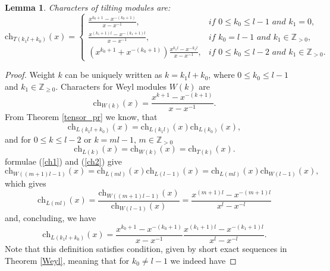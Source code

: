 \documentclass[11pt]{amsart}
\newtheorem{lemma}[theorem]{Lemma}
\begin{document}
\begin{lemma} \label{fchar}Characters of tilting modules are:
\begin{equation*}
\mathrm{ch}_{T(k_1l+k_0)}(x)=
\begin{cases}
\frac{x^{k_0+1}-x^{-(k_0+1)}}{x-x^{-1}},& \textit{if $0\leq k_0\leq l-1$ and $k_1=0$},\\
\frac{x^{(k_1+1)l}-x^{-(k_1+1)l}}{x-x^{-1}},& \textit{if $k_0=l-1$ and $k_1\in\mathbb{Z}_{>0}$},\\
(x^{k_0+1}+x^{-(k_0+1)})\frac{x^{k_1l}-x^{-k_1l}}{x-x^{-1}},& \textit{if $0\leq k_0\leq l-2$ and $k_1\in\mathbb{Z}_{>0}$}.
\end{cases}
\end{equation*}
	\end{lemma}
\begin{proof}
	Weight $k$ can be uniquely written as $k=k_1l+k_0$, where $0\leq k_0\leq l-1$ and $k_1\in\mathbb{Z}_{\geq 0}$. Characters for Weyl modules $W(k)$ are 	
	\begin{equation*}
	\mathrm{ch}_{W(k)}(x)=\frac{x^{k+1}-x^{-(k+1)}}{x-x^{-1}}.
	\end{equation*}
	From Theorem \ref{tensor_pr} we know, that 
	\begin{equation}\label{ch1}
	\mathrm{ch}_{L(k_1l+k_0)}(x)=\mathrm{ch}_{L(k_1l)}(x)\mathrm{ch}_{L(k_0)}(x),
	\end{equation}
	and for $0\leq k\leq l-2$ or $k=ml-1$, $m\in\mathbb{Z}_{>0}$
	\begin{equation}\label{ch2}
	\mathrm{ch}_{L(k)}(x)=\mathrm{ch}_{W(k)}(x)=\mathrm{ch}_{T(k)}(x).
	\end{equation}
	formulae (\ref{ch1}) and (\ref{ch2}) give
	\begin{equation*}
	\mathrm{ch}_{W((m+1)l-1)}(x)=\mathrm{ch}_{L(ml)}(x)\mathrm{ch}_{L(l-1)}(x)=\mathrm{ch}_{L(ml)}(x)\mathrm{ch}_{W(l-1)}(x),
	\end{equation*}
	which gives
	\begin{equation*}
	\mathrm{ch}_{L(ml)}(x)=\frac{\mathrm{ch}_{W((m+1)l-1)}(x)}{\mathrm{ch}_{W(l-1)}(x)}=\frac{x^{(m+1)l}-x^{-(m+1)l}}{x^l-x^{-l}}
	\end{equation*}
	and, concluding, we have
	\begin{equation*}
	\mathrm{ch}_{L(k_1l+k_0)}(x)=\frac{x^{k_0+1}-x^{-(k_0+1)}}{x-x^{-1}}\frac{x^{(k_1+1)l}-x^{-(k_1+1)l}}{x^l-x^{-l}}.
	\end{equation*}
	Note that this definition satisfies condition, given by short exact sequences in Theorem \ref{Weyl}, meaning that for $k_0\neq l-1$ we indeed have

\end{proof}
\end{document}
